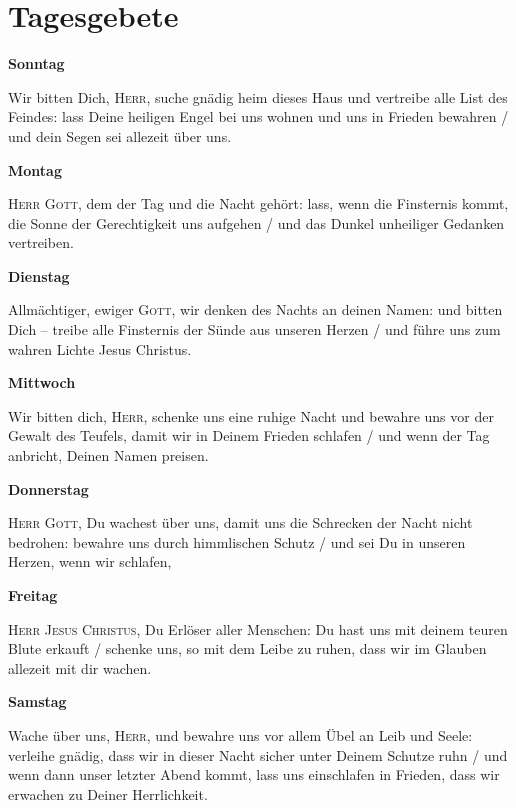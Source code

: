 \section*{Tagesgebete}
\begin{multicols}{2}\setlength{\columnseprule}{0.2pt} \textbf{Sonntag}\par
 Wir bitten Dich, \textsc{Herr}, suche gnädig heim dieses Haus und vertreibe alle List des Feindes: lass Deine heiligen Engel bei uns wohnen und uns in Frieden bewahren / und dein Segen sei allezeit über uns.\par
 \textbf{Montag}\par
 \textsc{Herr} \textsc{Gott}, dem der Tag und die Nacht gehört: lass, wenn die Finsternis kommt, die Sonne der Gerechtigkeit uns aufgehen / und das Dunkel unheiliger Gedanken vertreiben. \par
 \textbf{Dienstag}\par
 Allmächtiger, ewiger \textsc{Gott}, wir denken des Nachts an deinen Namen: und bitten Dich -- treibe alle Finsternis der Sünde aus unseren Herzen / und führe uns zum wahren Lichte Jesus Christus. \par
 \textbf{Mittwoch}\par
 Wir bitten dich, \textsc{Herr}, schenke uns eine ruhige Nacht und bewahre uns vor der Gewalt des Teufels, damit wir in Deinem Frieden schlafen / und wenn der Tag anbricht, Deinen Namen preisen. \par
 \textbf{Donnerstag}\par
 \textsc{Herr} \textsc{Gott}, Du wachest über uns, damit uns die Schrecken der Nacht nicht bedrohen: bewahre uns durch himmlischen Schutz / und sei Du in unseren Herzen, wenn wir schlafen, \par
\textbf{Freitag}\par
 \textsc{Herr} \textsc{Jesus Christus}, Du Erlöser aller Menschen: Du hast uns mit deinem teuren Blute erkauft / schenke uns, so mit dem Leibe zu ruhen, dass wir im Glauben allezeit mit dir wachen. \par
\textbf{Samstag}\par
 Wache über uns, \textsc{Herr}, und bewahre uns vor allem Übel an Leib und Seele: verleihe gnädig, dass wir in dieser Nacht sicher unter Deinem Schutze ruhn / und wenn dann unser letzter Abend kommt, lass uns einschlafen in Frieden, dass wir erwachen zu Deiner Herrlichkeit. \par
\end{multicols} \normalsize
